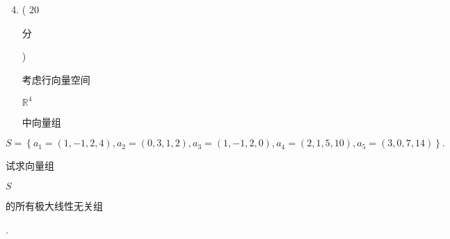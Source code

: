 \documentclass[10pt]{article}
\begin{document}
\begin{enumerate}
  \setcounter{enumi}{3}
  \item ( 20 \begin{CJK}{UTF8}{mj}分\end{CJK}) \begin{CJK}{UTF8}{mj}考虑行向量空间\end{CJK} $\mathbb{R}^{4}$ \begin{CJK}{UTF8}{mj}中向量组\end{CJK}
\end{enumerate}
$$
S=\left\{a_{1}=(1,-1,2,4), a_{2}=(0,3,1,2), a_{3}=(1,-1,2,0), a_{4}=(2,1,5,10), a_{5}=(3,0,7,14)\right\} .
$$
\begin{CJK}{UTF8}{mj}试求向量组\end{CJK} $S$ \begin{CJK}{UTF8}{mj}的所有极大线性无关组\end{CJK}.
\end{document}
